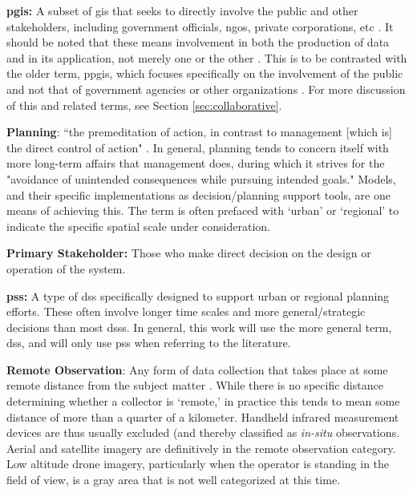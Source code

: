 \textbf{\acf{pgis}:} A subset of \ac{gis} that seeks to directly involve the public and other stakeholders, including government officials, \acp{ngo}, private corporations, etc \cite{sieberPublicParticipationGeographic2006}. It should be noted that these means involvement in both the production of data and in its application, not merely one or the other \cite{weinerParticipatoryGeographicInformation2007, talenBottomUpGIS2000}. This is to be contrasted with the older term, \ac{ppgis}, which focuses specifically on the involvement of the public and not that of government agencies or other organizations \cite{sieberPublicParticipationGeographic2006}. For more discussion of this and related terms, see Section \ref{sec:collaborative}.

\textbf{Planning}: ``the premeditation of action, in contrast to management [which is] the direct control of action" \cite{harrisLocationalModelsGeographic1993}. In general, planning tends to concern itself with more long-term affairs that management does, during which it strives for the "avoidance of unintended consequences while pursuing intended goals." Models, and their specific implementations as decision/planning support tools, are one means of achieving this. The term is often prefaced with `urban' or `regional' to indicate the specific spatial scale under consideration.

\textbf{Primary Stakeholder:} Those who make direct decision on the design or operation of the system.

\textbf{\acf{pss}:} A type of \ac{dss} specifically designed to support urban or regional planning efforts. These often involve longer time scales and more general/strategic decisions than most \acp{dss}. In general, this work will use the more general term, \ac{dss}, and will only use \ac{pss} when referring to the literature.

\textbf{Remote Observation}: Any form of data collection that takes place at some remote distance from the subject matter \cite{jensenRemoteSensingEnvironment2006}. While there is no specific distance determining whether a collector is `remote,' in practice this tends to mean some distance of more than a quarter of a kilometer. Handheld infrared measurement devices are thus usually excluded (and thereby classified as \textit{in-situ} observations. Aerial and satellite imagery are definitively in the remote observation category. Low altitude drone imagery, particularly when the operator is standing in the field of view, is a gray area that is not well categorized at this time.

